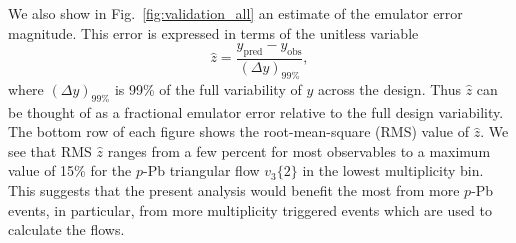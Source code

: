 \documentclass[aps,prc,reprint,amsmath,nofootinbib]{revtex4-1}
\begin{document}
We also show in Fig.~\ref{fig:validation_all} an estimate of the emulator error magnitude.
This error is expressed in terms of the unitless variable
\begin{equation}
  \hat{z} = \frac{y_\text{pred} - y_\text{obs}}{(\Delta y)_{99\%}},
\end{equation}
where $(\Delta y)_{99\%}$ is 99\% of the full variability of $y$ across the design.
Thus $\hat{z}$ can be thought of as a fractional emulator error relative to the full design variability.
The bottom row of each figure shows the root-mean-square (RMS) value of $\hat{z}$.
We see that RMS $\hat{z}$ ranges from a few percent for most observables to a maximum value of 15\% for the $p$-Pb triangular flow $v_3\{2\}$ in the lowest multiplicity bin.
This suggests that the present analysis would benefit the most from more $p$-Pb events, in particular, from more multiplicity triggered events which are used to calculate the flows.
\end{document}
